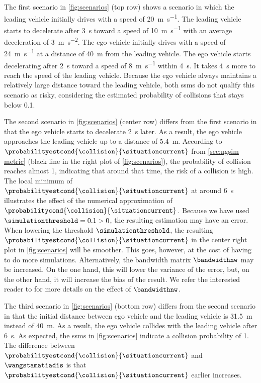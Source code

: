 The first scenario in \cref{fig:scenarios} (top row) shows a scenario in which the leading vehicle initially drives with a speed of \SI{20}{\meter\per\second}.
The leading vehicle starts to decelerate after \SI{3}{\second} toward a speed of \SI{10}{\meter\per\second} with an average deceleration of \SI{3}{\meter\per\second\squared}.
The ego vehicle initially drives with a speed of \SI{24}{\meter\per\second} at a distance of \SI{40}{\meter} from the leading vehicle.
The ego vehicle starts decelerating after \SI{2}{\second} toward a speed of \SI{8}{\meter\per\second} within \SI{4}{\second}.
It takes \SI{4}{\second} more to reach the speed of the leading vehicle.
Because the ego vehicle always maintains a relatively large distance toward the leading vehicle, both \acp{ssm} do not qualify this scenario as risky, considering the estimated probability of collisions that stays below 0.1.

The second scenario in \cref{fig:scenarios} (center row) differs from the first scenario in that the ego vehicle starts to decelerate \SI{2}{\second} later.
As a result, the ego vehicle approaches the leading vehicle up to a distance of \SI{5.4}{\meter}.
According to $\probabilityestcond{\collision}{\situationcurrent}$ from \cref{sec:ngsim metric} (black line in the right plot of \cref{fig:scenarios}), the probability of collision reaches almost 1, indicating that around that time, the risk of a collision is high.
The local minimum of $\probabilityestcond{\collision}{\situationcurrent}$ at around \SI{6}{\second} illustrates the effect of the numerical approximation of $\probabilitycond{\collision}{\situationcurrent}$.
Because we have used $\simulationthreshold=0.1>0$, the resulting estimation may have an error. 
When lowering the threshold $\simulationthreshold$, the resulting $\probabilityestcond{\collision}{\situationcurrent}$ in the center right plot in \cref{fig:scenarios} will be smoother. 
This goes, however, at the cost of having to do more simulations.
Alternatively, the bandwidth matrix $\bandwidthnw$ may be increased. 
On the one hand, this will lower the variance of the error, but, on the other hand, it will increase the bias of the result.
We refer the interested reader to \autocite{chen2017tutorial} for more details on the effect of $\bandwidthnw$.

The third scenario in \cref{fig:scenarios} (bottom row) differs from the second scenario in that the initial distance between ego vehicle and the leading vehicle is \SI{31.5}{\meter} instead of \SI{40}{\meter}. 
As a result, the ego vehicle collides with the leading vehicle after \SI{6}{\second}.
As expected, the \acp{ssm} in \cref{fig:scenarios} indicate a collision probability of 1.
The difference between $\probabilityestcond{\collision}{\situationcurrent}$ and $\wangstamatiadis$ is that $\probabilityestcond{\collision}{\situationcurrent}$ earlier increases. 




